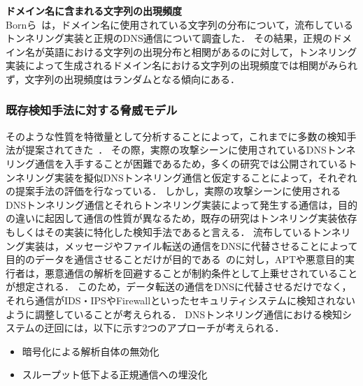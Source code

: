 \hspace{-12pt}\textbf{ドメイン名に含まれる文字列の出現頻度}\\
\hspace{12pt}Bornら~\cite{born}は，ドメイン名に使用されている文字列の分布について，流布しているトンネリング実装と正規のDNS通信について調査した．
その結果，正規のドメイン名が英語における文字列の出現分布と相関があるのに対して，トンネリング実装によって生成されるドメイン名における文字列の出現頻度では相関がみられず，文字列の出現頻度はランダムとなる傾向にある．
\subsubsection{既存検知手法に対する脅威モデル}
\label{sec:bypass-method}
そのような性質を特徴量として分析することによって，これまでに多数の検知手法が提案されてきた~\cite{born, cheng, liu, asaf, steadman, jawad}．
その際，実際の攻撃シーンに使用されているDNSトンネリング通信を入手することが困難であるため，多くの研究では公開されているトンネリング実装を擬似DNSトンネリング通信と仮定することによって，それぞれの提案手法の評価を行なっている．
しかし，実際の攻撃シーンに使用されるDNSトンネリング通信とそれらトンネリング実装によって発生する通信は，目的の違いに起因して通信の性質が異なるため，既存の研究はトンネリング実装依存もしくはその実装に特化した検知手法であると言える．
流布しているトンネリング実装は，メッセージやファイル転送の通信をDNSに代替させることによって目的のデータを通信させることだけが目的である~\cite{iodine}のに対し，APTや悪意目的実行者は，悪意通信の解析を回避することが制約条件として上乗せされていることが想定される．
このため，データ転送の通信をDNSに代替させるだけでなく，それら通信がIDS・IPSやFirewallといったセキュリティシステムに検知されないように調整していることが考えられる．
DNSトンネリング通信における検知システムの迂回には，以下に示す2つのアプローチが考えられる．
\vspace{-5pt}
\begin{itemize}
 \item 暗号化による解析自体の無効化
 \vspace{-5pt}
 \item スループット低下よる正規通信への埋没化
\end{itemize}

